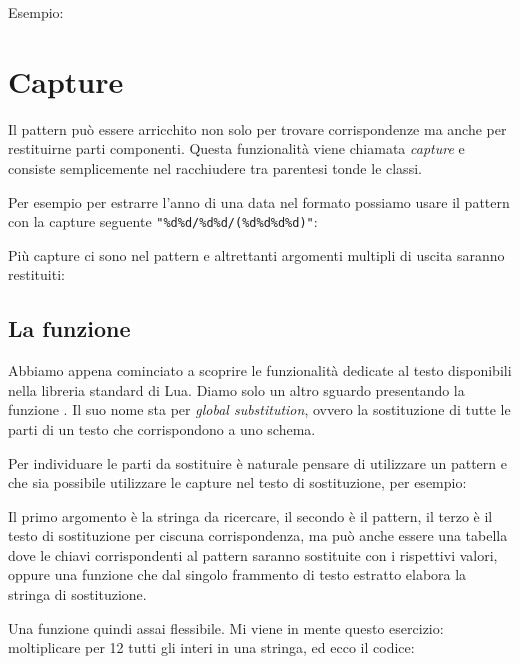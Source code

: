 Esempio:

\section{Capture}
\label{secFondCapture}

Il pattern può essere arricchito non solo per trovare corrispondenze ma anche
per restituirne parti componenti. Questa funzionalità viene chiamata
\emph{capture} e consiste semplicemente nel racchiudere tra parentesi tonde le
classi.

Per esempio per estrarre l'anno di una data nel formato 
possiamo usare il pattern con la capture seguente \verb|"%d%d/%d%d/(%d%d%d%d)"|:

Più capture ci sono nel pattern e altrettanti argomenti multipli di uscita
saranno restituiti:


\subsection{La funzione }
\label{secFondGsub}

Abbiamo appena cominciato a scoprire le funzionalità dedicate al testo
disponibili nella libreria standard di Lua. Diamo solo un altro sguardo
presentando la funzione . Il suo nome sta
per \emph{global substitution}, ovvero la sostituzione di tutte le parti di un
testo che corrispondono a uno schema.

Per individuare le parti da sostituire è naturale pensare di utilizzare un
pattern e che sia possibile utilizzare le capture nel testo di sostituzione, per
esempio:

Il primo argomento è la stringa da ricercare, il secondo è il pattern, il terzo
è il testo di sostituzione per ciscuna corrispondenza, ma può anche essere una
tabella dove le chiavi corrispondenti al pattern saranno sostituite con i
rispettivi valori, oppure una funzione che dal singolo frammento di testo
estratto elabora la stringa di sostituzione.

Una funzione quindi assai flessibile. Mi viene in mente questo esercizio:
moltiplicare per 12 tutti gli interi in una stringa, ed ecco il codice:

